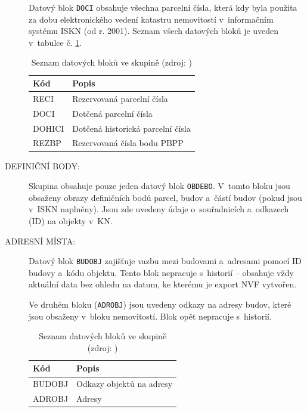 \documentclass[a4paper,12pt,oneside]{book}
\begin{document}
\begin{description}
 Datový blok \texttt{DOCI} obsahuje všechna parcelní čísla, která kdy byla použita za dobu elektronického vedení katastru nemovitostí v~informačním systému ISKN (od r. 2001). Seznam všech datových bloků je uveden v~tabulce č. \ref{t_skupina_rezCisla}. \cite{dp_landa} \cite{vfk_struktura}

\begin{table}[htbp]
\centering
\caption[Seznam datových bloků ve skupině ]{Seznam datových bloků ve skupině  (zdroj: \cite{vfk_struktura})}
\begin{tabular}{ll}
\toprule
\textbf{Kód} & \textbf{Popis} \\ 
\midrule
RECI & Rezervovaná parcelní čísla \\
DOCI & Dotčená parcelní čísla \\
DOHICI & Dotčená historická parcelní čísla \\
REZBP & Rezervovaná čísla bodu PBPP \\
\bottomrule
\end{tabular}
\label{t_skupina_rezCisla}
\end{table}

 \item[DEFINIČNÍ BODY:] Skupina obsahuje pouze jeden datový blok \texttt{OBDEBO}. V~tomto bloku jsou obsaženy obrazy definičních bodů parcel, budov a~částí budov (pokud jsou v~ISKN naplněny). Jsou zde uvedeny údaje o~souřadnicích a~odkazech (ID) na objekty v~KN. \cite{vfk_struktura}
 
 \item[ADRESNÍ MÍSTA:] Datový blok \texttt{BUDOBJ} zajišťuje vazbu mezi budovami a~adresami pomocí ID budovy a~kódu objektu. Tento blok nepracuje s~historií -- obsahuje vždy aktuální data bez ohledu na datum, ke kterému je export NVF vytvořen.
 
 Ve druhém bloku (\texttt{ADROBJ}) jsou uvedeny odkazy na adresy budov, které jsou obsaženy v~bloku nemovitostí. Blok opět nepracuje s~historií. \cite{vfk_struktura}

\begin{table}[htbp]
\centering
\caption[Seznam datových bloků ve skupině ]{Seznam datových bloků ve skupině  (zdroj: \cite{vfk_struktura})}
\begin{tabular}{ll}
\toprule
\textbf{Kód} & \textbf{Popis} \\ 
\midrule
BUDOBJ & Odkazy objektů na adresy \\
ADROBJ & Adresy \\
\bottomrule
\end{tabular}
\label{t_skupina_adrMista}
\end{table}
 
\end{description}
\end{document}
